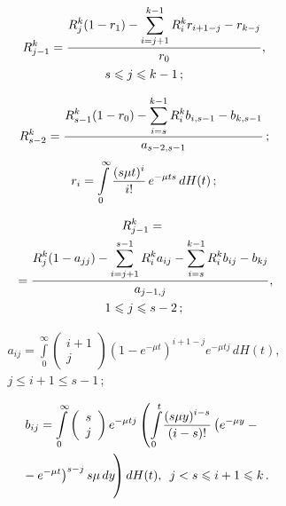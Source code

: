 \begin{multicols}{2}
\vspace*{-12pt}

\noindent
\begin{multline*}
 R_{j-1}^k=\displaystyle\frac{\displaystyle R_j^k(1-r_1)-\sum\limits_{i=j+1}^{k-1}
R_i^kr_{i+1-j}-r_{k-j}\mathstrut}{\displaystyle r_0\mathstrut},\\
 s\leqslant j\leqslant k-1\,;
\end{multline*}

\noindent
\begin{equation*}
R_{s-2}^k=\displaystyle\frac{\displaystyle R_{s-1}^k(1-r_0)-
\sum\limits_{i=s}^{k-1}R_i^kb_{i,s-1}-b_{k,s-1}\mathstrut}{\displaystyle a_{s-2,s-1}\mathstrut}\,;
\end{equation*}
\begin{equation}
 r_{i}=\int\limits_0^{\infty}\displaystyle\frac{\displaystyle (s\mu t)^i\mathstrut}{\displaystyle i!\mathstrut}\,e^{-\mu ts}\,dH(t)\,;
 \label{q3}
\end{equation}

\vspace*{-12pt}

\noindent
\begin{multline*}
R_{j-1}^k={}\\
{}=\displaystyle\frac{\displaystyle R_{j}^k(1-a_{jj})-\sum\limits_{i=j+1}^{s-1}R_i^ka_{ij}-
\sum\limits_{i=s}^{k-1}
R_i^kb_{ij}-b_{kj}\mathstrut}{\displaystyle a_{j-1,j}\mathstrut},\\
1\leqslant j\leqslant s-2\,;
\end{multline*}
\vspace*{-12pt}

\noindent
\begin{multline*}
a_{ij}=\int\limits_0^{\infty}\left(
\begin{array}{c}i+1\\ j\end{array}
\right)
\left(1-e^{-\mu t}\right)^{i+1-j}e^{-\mu tj}\,dH(t),\\
 j\leqslant i+1\leqslant s-1\,;
\end{multline*}
\vspace*{-12pt}

\noindent
\begin{multline*}
b_{ij}=\int\limits_0^{\infty}\left(
\begin{array}{c}s\\
j\end{array}\right)
e^{-\mu tj}\left(\int\limits_0^t\!
\displaystyle\frac{\displaystyle (s\mu y)^{i-s}\mathstrut}{\displaystyle (i-s)!\mathstrut}\left( e^{-\mu y}-{}\right.\right.\\
\left.\left.{}-e^{-\mu t}\right)^{s-j}s\mu
\,dy\!
\vphantom{\int\limits_0^t}
\right)dH(t),\enskip j<s\leqslant i+1\leqslant k\,.
\end{multline*}


\end{multicols}

